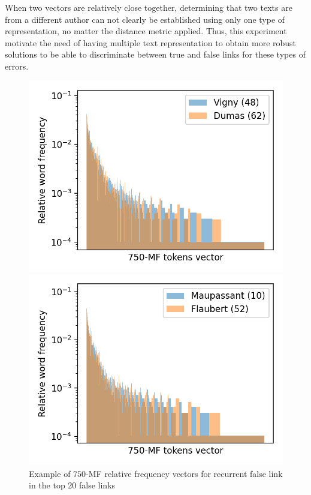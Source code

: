 When two vectors are relatively close together, determining that two texts are from a different author can not clearly be established using only one type of representation, no matter the distance metric applied.
Thus, this experiment motivate the need of having multiple text representation to obtain more robust solutions to be able to discriminate between true and false links for these types of errors.

\begin{figure}
  \centering
  \caption{Example of $750$-MF relative frequency vectors for recurrent false link in the top 20 false links}
  \label{fig:mf_vector_error}

  \label{fig:mf_vector_error_0}
  \includegraphics[width=\linewidth]{img/mf_vector_error_0.png}

  \vspace{0.5cm}

  \label{fig:mf_vector_error_1}
  \includegraphics[width=\linewidth]{img/mf_vector_error_1.png}
\end{figure}

